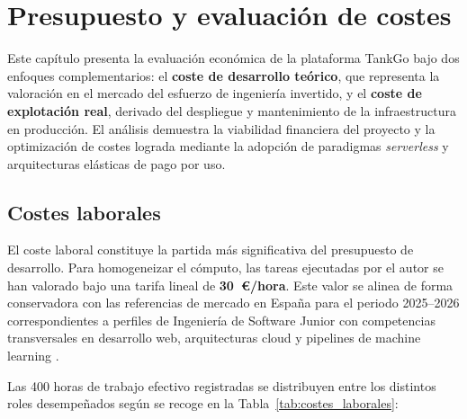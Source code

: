 
\chapter{Presupuesto y evaluación de costes}

Este capítulo presenta la evaluación económica de la plataforma TankGo bajo dos enfoques complementarios:
el \textbf{coste de desarrollo teórico}, que representa la valoración en el mercado del esfuerzo de ingeniería invertido,
y el \textbf{coste de explotación real}, derivado del despliegue y mantenimiento de la infraestructura en producción.
El análisis demuestra la viabilidad financiera del proyecto y la optimización de costes lograda mediante la adopción
de paradigmas \textit{serverless} y arquitecturas elásticas de pago por uso.

\section{Costes laborales}
El coste laboral constituye la partida más significativa del presupuesto de desarrollo.
Para homogeneizar el cómputo, las tareas ejecutadas por el autor se han valorado bajo una tarifa lineal de \textbf{30~€/hora}.
Este valor se alinea de forma conservadora con las referencias de mercado en España para el periodo 2025--2026 correspondientes
a perfiles de Ingeniería de Software Junior con competencias transversales en desarrollo web, arquitecturas cloud y pipelines de
machine learning \cite{glassdoor2026salarios, jobted2026salarios}.

Las 400 horas de trabajo efectivo registradas se distribuyen entre los distintos roles
desempeñados según se recoge en la Tabla~\ref{tab:costes_laborales}:

